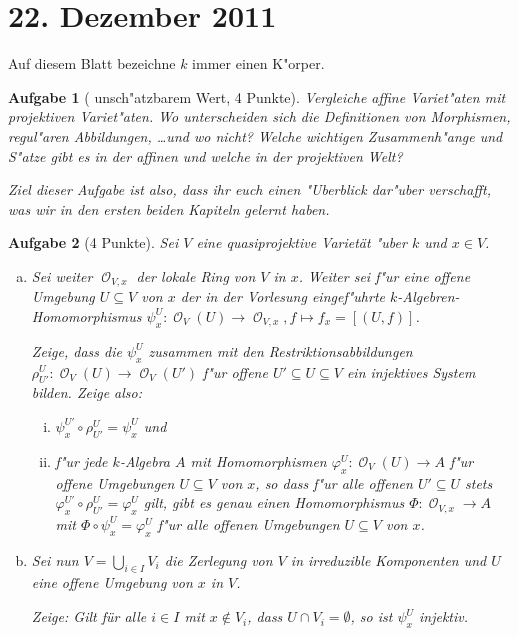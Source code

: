 \documentclass[a4paper, 12pt, numbers=noendperiod, chapterprefix=true]{scrbook}
\theoremstyle{break}
\newtheorem{Aufg}{Aufgabe}
\theoremstyle{nonumberbreak}
\theoremstyle{nonumberplain}
\newcommand{\A}{\mathbb{A}}
\DeclareMathOperator{\Reg}{\mathcal{O}} %
\begin{document}
\newpage
\section{22. Dezember 2011}
\setcounter{Aufg}{0}
\setcounter{Loes}{1}

Auf diesem Blatt bezeichne $k$ immer einen K"orper.

\begin{Aufg}[ unsch"atzbarem Wert, 4 Punkte]
Vergleiche affine Variet"aten mit projektiven Variet"aten. Wo unterscheiden sich die Definitionen von Morphismen, regul"aren Abbildungen, \dots und wo nicht? Welche wichtigen Zusammenh"ange und S"atze gibt es in der affinen und welche in der projektiven Welt?

Ziel dieser Aufgabe ist also, dass ihr euch einen "Uberblick dar"uber verschafft, was wir in den ersten beiden Kapiteln gelernt haben.
\end{Aufg}

\begin{Aufg}[4 Punkte]
Sei $V$ eine quasiprojektive Variet\"at "uber $k$ und $x \in V$.
\begin{enumerate}[a)]
	\item Sei weiter $\Reg_{V,x}$ der lokale Ring von $V$ in $x$. Weiter sei f"ur eine offene Umgebung $U \subseteq V$ von $x$ der in der Vorlesung eingef"uhrte $k$-Algebren-Homomorphismus $\psi_x^U: \Reg_V(U) \to \Reg_{V,x}, f \mapsto f_x=[(U,f)]$.  
 
	Zeige, dass die $\psi_x^U$ zusammen mit den Restriktionsabbildungen $\rho^U_{U'}: \Reg_V(U) \to \Reg_V(U')$ f"ur offene $U' \subseteq U \subseteq V$ ein injektives System bilden. Zeige also:
	\begin{enumerate}[i)]
		\item $\psi_x^{U'} \circ \rho^U_{U'} = \psi_x^U$ und
		\item f"ur jede $k$-Algebra $A$ mit Homomorphismen $\varphi_x^U : \Reg_V(U) \to A$ f"ur offene Umgebungen $U \subseteq V$ von $x$, so dass f"ur alle offenen $U' \subseteq U$ stets $\varphi_x^{U'} \circ \rho^U_{U'} = \varphi_x^U$ gilt, gibt es genau einen Homomorphismus $\Phi : \Reg_{V,x} \to A$ mit $\Phi \circ \psi_x^U = \varphi_x^U$ f"ur alle offenen Umgebungen $U \subseteq V$ von $x$.
	\end{enumerate}
	\item Sei nun $V = \bigcup_{i \in I} V_i$ die Zerlegung von $V$ in irreduzible Komponenten und $U$ eine offene Umgebung von $x$ in $V$. 

	Zeige: Gilt für alle $i \in I$ mit $x \notin V_i$, dass $U \cap V_i = \emptyset$, so ist $\psi^U_x$ injektiv.
\end{enumerate}\end{Aufg}
\end{document}
